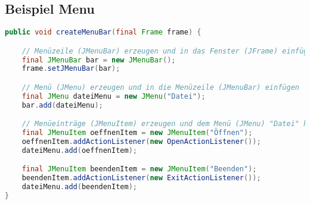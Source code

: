 \subsection{Beispiel Menu}
\begin{lstlisting}[language=Java]
public void createMenuBar(final Frame frame) {

	// Menüzeile (JMenuBar) erzeugen und in das Fenster (JFrame) einfügen
	final JMenuBar bar = new JMenuBar();
	frame.setJMenuBar(bar);

	// Menü (JMenu) erzeugen und in die Menüzeile (JMenuBar) einfügen
	final JMenu dateiMenu = new JMenu("Datei");
	bar.add(dateiMenu);

	// Menüeinträge (JMenuItem) erzeugen und dem Menü (JMenu) "Datei" hinzufügen
	final JMenuItem oeffnenItem = new JMenuItem("Öffnen");
	oeffnenItem.addActionListener(new OpenActionListener());
	dateiMenu.add(oeffnenItem);

	final JMenuItem beendenItem = new JMenuItem("Beenden");
	beendenItem.addActionListener(new ExitActionListener());
	dateiMenu.add(beendenItem);
}
\end{lstlisting}
